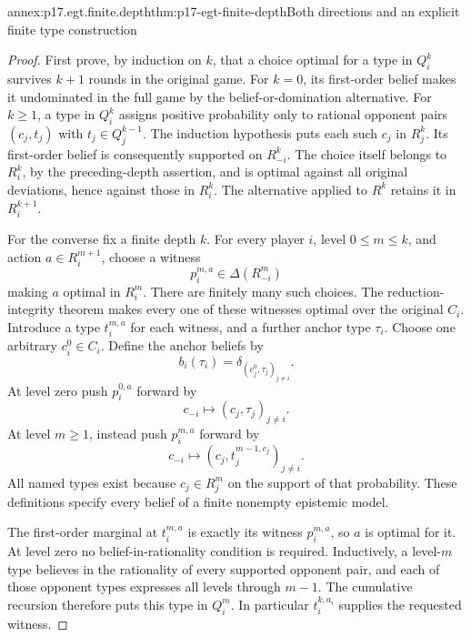 \begin{annexitem}{annex:p17.egt.finite.depth}{thm:p17-egt-finite-depth}{Both directions and an explicit finite type construction}
\begin{proof}
First prove, by induction on \(k\), that a choice optimal for a
type in \(Q_i^k\) survives \(k+1\) rounds in the original game.
For \(k=0\), its first-order belief makes it undominated in
the full game by the belief-or-domination alternative.
For \(k\geq1\), a type in \(Q_i^k\) assigns positive probability
only to rational opponent pairs \((c_j,t_j)\) with
\(t_j\in Q_j^{k-1}\). The induction hypothesis puts each such
\(c_j\) in \(R_j^k\). Its first-order belief is consequently
supported on \(R_{-i}^k\). The choice itself belongs to \(R_i^k\),
by the preceding-depth assertion, and is optimal against
all original deviations, hence against those in \(R_i^k\).
The alternative applied to \(R^k\) retains it in \(R_i^{k+1}\).

For the converse fix a finite depth \(k\). For every player \(i\),
level \(0\leq m\leq k\), and action \(a\in R_i^{m+1}\),
choose a witness
\[
 p_i^{m,a}\in\Delta(R_{-i}^m)
\]
making \(a\) optimal in \(R_i^m\). There are finitely many
such choices. The reduction-integrity theorem makes every
one of these witnesses optimal over the original \(C_i\).
Introduce a type \(t_i^{m,a}\) for each witness, and a further
anchor type \(\tau_i\). Choose one arbitrary \(c_i^0\in C_i\).
Define the anchor beliefs by
\[
             b_i(\tau_i)=\delta_{(c_j^0,\tau_j)_{j\ne i}}.
\]
At level zero push \(p_i^{0,a}\) forward by
\[
             c_{-i}\longmapsto(c_j,\tau_j)_{j\ne i}.
\]
At level \(m\geq1\), instead push \(p_i^{m,a}\) forward by
\[
             c_{-i}\longmapsto(c_j,t_j^{m-1,c_j})_{j\ne i}.
\]
All named types exist because \(c_j\in R_j^m\) on the
support of that probability. These definitions specify every
belief of a finite nonempty epistemic model.

The first-order marginal at \(t_i^{m,a}\) is exactly its
witness \(p_i^{m,a}\), so \(a\) is optimal for it.
At level zero no belief-in-rationality condition is required.
Inductively, a level-\(m\) type believes in the rationality
of every supported opponent pair, and each of those opponent
types expresses all levels through \(m-1\).
The cumulative recursion therefore puts this type in \(Q_i^m\).
In particular \(t_i^{k,a_i}\) supplies the requested witness.
\end{proof}
\end{annexitem}

